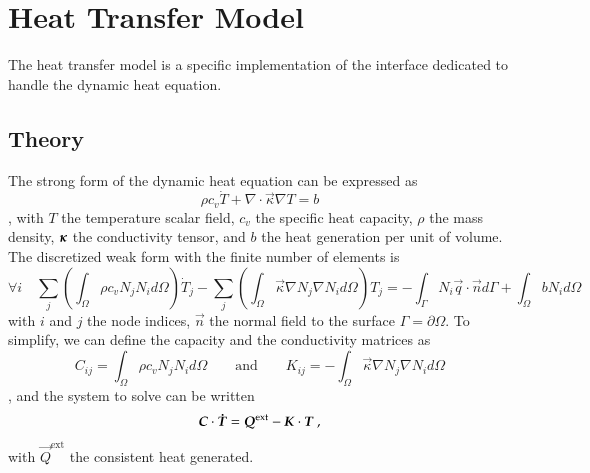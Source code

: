 \chapter{Heat Transfer Model}

The heat transfer model is a specific implementation of the  interface
dedicated to handle the dynamic heat equation. 
\section{Theory}
The strong form of the dynamic heat equation 
can be expressed as
\begin{equation}
  \rho c_v \dot{T} + \nabla \cdot \vec{\kappa} \nabla T = b
\end{equation}
, with $T$ the temperature scalar field,
$c_v$ the specific heat capacity, 
$\rho$ the mass density, 
$\boldsymbol{\kappa}$ the conductivity tensor, and $b$ the heat generation per unit of volume. 
The discretized weak form with the finite number of elements is
\begin{equation}
  \forall i \quad 
  \sum_j \left( \int_\Omega \rho c_v N_j N_i  d\Omega \right) \dot{T}_j 
  - \sum_j \left( \int_\Omega \vec{\kappa} \nabla N_j \nabla N_i d\Omega \right) T_j = 
  - \int_{\Gamma}  N_i \vec{q} \cdot \vec{n} d\Gamma + \int_\Omega b N_i d\Omega
\end{equation}
with $i$ and $j$ the node indices, $\vec{n}$ the normal field to the surface 
$\Gamma = \partial \Omega$. 
To simplify, we can define the capacity and the conductivity matrices as
\begin{equation}
  C_{ij} = \int_\Omega \rho c_v N_j N_i  d\Omega \qquad \textrm{and} \qquad   
  K_{ij} = - \int_\Omega \vec{\kappa} \nabla N_j \nabla N_i d\Omega
\end{equation}
, and the system to solve can be written
\begin{equation}
  \boldsymbol{C} \cdot \boldsymbol{\dot{T}} = \boldsymbol{Q}^{\text{ext}} -\boldsymbol{K} \cdot \boldsymbol{T}~, 
\end{equation}
with $\vec{Q}^{\text{ext}}$ the consistent heat generated.
